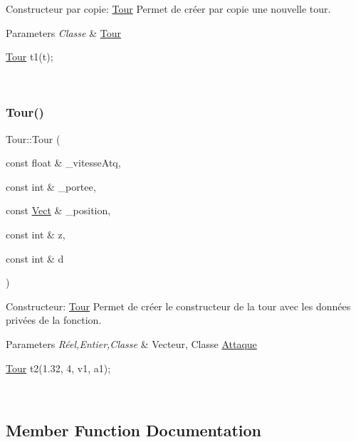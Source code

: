 Constructeur par copie\+: \hyperlink{classTour}{Tour} Permet de créer par copie une nouvelle tour. 


\begin{DoxyParams}{Parameters}
{\em Classe} & \hyperlink{classTour}{Tour} 
\begin{DoxyCode}
\hyperlink{classTour}{Tour} t1(t);
\end{DoxyCode}
 \\
\hline
\end{DoxyParams}
\mbox{\label{classTour_abb21d80605aacb220f1ab7ac92119ce4}} 
\subsubsection{\texorpdfstring{Tour()}{Tour()}\hspace{0.1cm}{\footnotesize\ttfamily [3/3]}}
{\footnotesize\ttfamily Tour\+::\+Tour (\begin{DoxyParamCaption}\item[{const float \&}]{\+\_\+vitesse\+Atq,  }\item[{const int \&}]{\+\_\+portee,  }\item[{const \hyperlink{classVect}{Vect} \&}]{\+\_\+position,  }\item[{const int \&}]{z,  }\item[{const int \&}]{d }\end{DoxyParamCaption})}



Constructeur\+: \hyperlink{classTour}{Tour} Permet de créer le constructeur de la tour avec les données privées de la fonction. 


\begin{DoxyParams}{Parameters}
{\em Réel,Entier,Classe} & Vecteur, Classe \hyperlink{classAttaque}{Attaque} 
\begin{DoxyCode}
\hyperlink{classTour}{Tour} t2(1.32, 4, v1, a1);
\end{DoxyCode}
 \\
\hline
\end{DoxyParams}


\subsection{Member Function Documentation}
\mbox{\label{classTour_a418908de2fcbb83e8e9459a999f98aa6}} 
